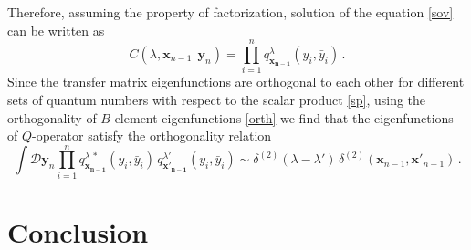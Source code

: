 \documentclass[a4paper,11pt]{article}
\numberwithin{equation}{section}
\begin{document}
Therefore, assuming the property of factorization, solution of the equation \eqref{sov} can be written as
\begin{equation*}
	C(\lambda, \bm{x}_{n-1}|\,\bm{y}_{n}) = \prod\limits_{i=1}^{n} q^{\lambda}_{\bm{x_{n-1}}}(y_i,\bar{y}_i) \,.
\end{equation*}
Since the transfer matrix eigenfunctions are orthogonal to each other for different sets of quantum numbers with respect to the scalar product \eqref{sp}, using the orthogonality of $B$-element eigenfunctions \eqref{orth} we find that the eigenfunctions of $Q$-operator satisfy the orthogonality relation
\begin{equation*}
	\int \mathcal{D}\bm{y}_n \prod\limits_{i=1}^{n} q^{\lambda\,\ast}_{\bm{x_{n-1}}}(y_i,\bar{y}_i)\,q^{\lambda'}_{\bm{x'_{n-1}}}(y_i,\bar{y}_i) \sim \delta^{(2)}(\lambda-\lambda')\,\delta^{(2)}(\bm{x}_{n-1},\bm{x'}_{n-1}) \,.
\end{equation*}	


\section{Conclusion} \label{sect:conclusion}
\end{document}

